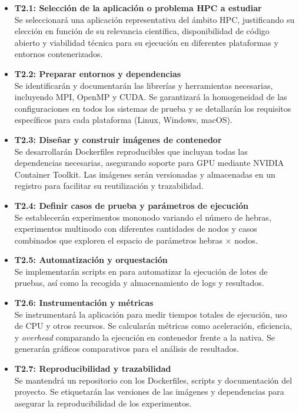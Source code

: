 \begin{itemize}[noitemsep]
      \item \textbf{T2.1: Selección de la aplicación o problema HPC a estudiar} \\
            Se seleccionará una aplicación representativa del ámbito HPC, justificando su elección en función de su relevancia científica, disponibilidad de código abierto y viabilidad técnica para su ejecución en diferentes plataformas y entornos contenerizados.

      \item \textbf{T2.2: Preparar entornos y dependencias} \\
            Se identificarán y documentarán las librerías y herramientas necesarias, incluyendo MPI, OpenMP y CUDA. Se garantizará la homogeneidad de las configuraciones en todos los sistemas de prueba y se detallarán los requisitos específicos para cada plataforma (Linux, Windows, macOS).

      \item \textbf{T2.3: Diseñar y construir imágenes de contenedor} \\
            Se desarrollarán Dockerfiles reproducibles que incluyan todas las dependencias necesarias, asegurando soporte para GPU mediante NVIDIA Container Toolkit. Las imágenes serán versionadas y almacenadas en un registro para facilitar su reutilización y trazabilidad.

      \item \textbf{T2.4: Definir casos de prueba y parámetros de ejecución} \\
            Se establecerán experimentos mononodo variando el número de hebras, experimentos multinodo con diferentes cantidades de nodos y casos combinados que exploren el espacio de parámetros hebras × nodos.

      \item \textbf{T2.5: Automatización y orquestación} \\
            Se implementarán scripts en para automatizar la ejecución de lotes de pruebas, así como la recogida y almacenamiento de logs y resultados.

      \item \textbf{T2.6: Instrumentación y métricas} \\
            Se instrumentará la aplicación para medir tiempos totales de ejecución, uso de CPU y otros recursos. Se calcularán métricas como aceleración, eficiencia, y \textit{overhead} comparando la ejecución en contenedor frente a la nativa. Se generarán gráficos comparativos para el análisis de resultados.

      \item \textbf{T2.7: Reproducibilidad y trazabilidad} \\
            Se mantendrá un repositorio con los Dockerfiles, scripts y documentación del proyecto. Se etiquetarán las versiones de las imágenes y dependencias para asegurar la reproducibilidad de los experimentos.
\end{itemize}

